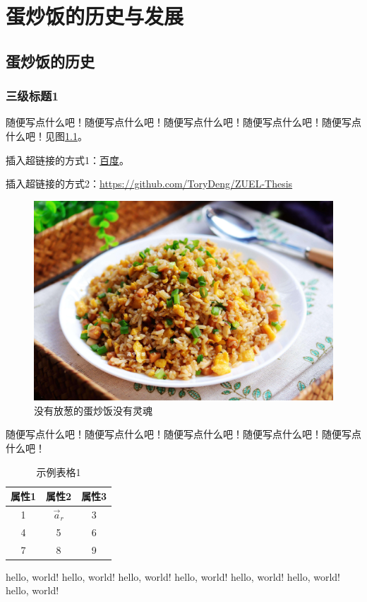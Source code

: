 \chapter{蛋炒饭的历史与发展}
\section{蛋炒饭的历史}
\subsection{三级标题1}
随便写点什么吧！随便写点什么吧！随便写点什么吧！随便写点什么吧！随便写点什么吧！见图\ref{fig:my_label}。

插入超链接的方式1：\href{http://www.baidu.com}{百度}。 \par
插入超链接的方式2：\url{https://github.com/ToryDeng/ZUEL-Thesis}

\begin{figure}[h]
    \centering
    \includegraphics[scale=0.1]{imgs/蛋炒饭.jpeg}
    \caption{没有放葱的蛋炒饭没有灵魂}
    \label{fig:my_label}
\end{figure}

随便写点什么吧！随便写点什么吧！随便写点什么吧！随便写点什么吧！随便写点什么吧！
\begin{table}[h]

\caption{示例表格1}
\begin{center}
    \begin{tabular}{ccc}
    \toprule
    \textbf{属性1} & \textbf{属性2} & \textbf{属性3} \\ \midrule
    1            & $\Vec{a}_r$  & 3            \\
    4            & 5            & 6            \\
    7            & 8            & 9            \\ \bottomrule
    \end{tabular}
\end{center}\label{tab:exp_table1}

\end{table}
hello, world! hello, world! hello, world! hello, world! hello, world! hello, world! hello, world!